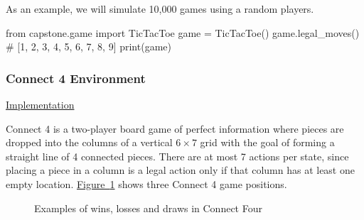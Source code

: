 \documentclass{article}
\newcommand{\GithubURL}[2]{
\noindent
\href{https://github.com/davidrobles/mlnd-capstone-code/blob/master/#1}{#2}
\break
}
\begin{document}
As an example, we will simulate 10,000 games using a random players.

\begin{python}
from capstone.game import TicTacToe
game = TicTacToe()
game.legal_moves() # [1, 2, 3, 4, 5, 6, 7, 8, 9]
print(game)
\end{python}

\subsubsection{Connect 4 Environment}

\GithubURL{capstone/game/connect4.py}{Implementation}

Connect 4 is a two-player board game of perfect information where pieces are dropped into the
columns of a vertical $6 \times 7$ grid with the goal of forming a straight line of 4 connected
pieces. There are at most 7 actions per state, since placing a piece in a column is a legal action
only if that column has at least one empty location. \hyperref[fig:c4-env]{Figure~\ref*{fig:c4-env}}
shows three Connect 4 game positions.


\begin{figure}[!h]
    \centering
     \hspace{0.1in}
     \hspace{0.1in}
    \caption{Examples of wins, losses and draws in Connect Four}
    \label{fig:c4-env}
\end{figure}
\end{document}
